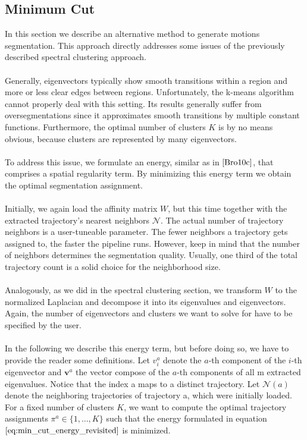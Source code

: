 \subsection{Minimum Cut} 
\label{sec:min_cut_seg}
In this section we describe an alternative method to generate motions segmentation. This approach directly addresses some issues of the previously described spectral clustering approach. \\ \\
Generally, eigenvectors typically show smooth transitions within a region and more or less clear edges between regions. Unfortunately, the k-means algorithm cannot properly deal with this setting. Its results generally suffer from oversegmentations since it approximates smooth transitions by multiple constant functions. Furthermore, the optimal number of clusters $K$ is by no means obvious, because clusters are represented by many eigenvectors. \\ \\
To address this issue, we formulate an energy, similar as in $\cite{Bro10c}$, that comprises a spatial regularity term. By minimizing this energy term we obtain the optimal segmentation assignment. \\ \\
Initially, we again load the affinity matrix $W$, but this time together with the extracted trajectory's nearest neighbors $\mathcal{N}$. The actual number of trajectory neighbors is a user-tuneable parameter. The fewer neighbors a trajectory gets assigned to, the faster the pipeline runs. However, keep in mind that the number of neighbors determines the segmentation quality. Usually, one third of the total trajectory count is a solid choice for the neighborhood size. \\ \\ 
Analogously, as we did in the spectral clustering section, we transform $W$ to the normalized Laplacian and decompose it into its eigenvalues and eigenvectors. Again, the number of eigenvectors and clusters we want to solve for have to be specified by the user. \\ \\
In the following we describe this energy term, but before doing so, we have to provide the reader some definitions. Let $v_i^a$ denote the $a$-th component of the $i$-th eigenvector and $\textbf{v}^a$ the vector compose of the $a$-th components of all m extracted eigenvalues. Notice that the index a maps to a distinct trajectory. Let $\mathcal{N} \left( a \right)$ denote the neighboring trajectories of trajectory a, which were initially loaded. For a fixed number of clusters $K$, we want to compute the optimal trajectory assignments $\pi^{a} \in \{ 1, \dots , K \}$ such that the energy formulated in equation $\ref{eq:min_cut_energy_revisited}$ is minimized.
